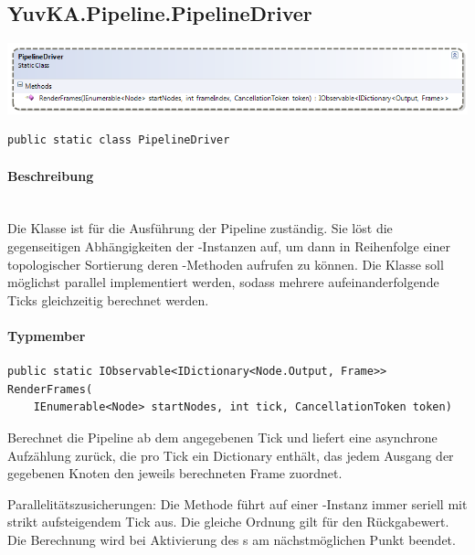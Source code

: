 \subsection{YuvKA.Pipeline.PipelineDriver}

\includegraphics[width=\textwidth]{YuvKA.Pipeline/driver.png}
\begin{verbatim}
public static class PipelineDriver
\end{verbatim}

\paragraph{Beschreibung}~\\
Die Klasse  ist für die Ausführung der Pipeline zuständig. Sie löst die gegenseitigen Abhängigkeiten der -Instanzen auf, um dann in Reihenfolge einer topologischer Sortierung deren -Methoden aufrufen zu können.
Die Klasse soll möglichst parallel implementiert werden, sodass mehrere aufeinanderfolgende Ticks gleichzeitig berechnet werden.

\paragraph{Typmember}
\begin{itemize}

	\begin{verbatim}
public static IObservable<IDictionary<Node.Output, Frame>> RenderFrames(
    IEnumerable<Node> startNodes, int tick, CancellationToken token)
    \end{verbatim}
	Berechnet die Pipeline ab dem angegebenen Tick und liefert eine asynchrone Aufzählung zurück, die pro Tick ein Dictionary enthält, das jedem Ausgang der gegebenen Knoten  den jeweils berechneten Frame zuordnet.

    Parallelitätszusicherungen: Die Methode führt auf einer -Instanz  immer seriell mit strikt aufsteigendem Tick aus. Die gleiche Ordnung gilt für den Rückgabewert. Die Berechnung wird bei Aktivierung des s am nächstmöglichen Punkt beendet.

\end{itemize}
